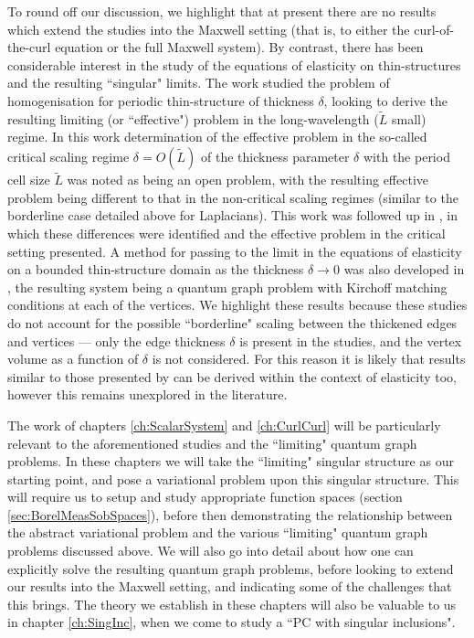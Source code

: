 To round off our discussion, we highlight that at present there are no results which extend the studies \cite{kuchment2001convergence, kuchment2003asymptotics, exner2005convergence} into the Maxwell setting (that is, to either the curl-of-the-curl equation or the full Maxwell system).
By contrast, there has been considerable interest in the study of the equations of elasticity on thin-structures and the resulting ``singular" limits.
The work \cite{zhikov2002homogenization} studied the problem of homogenisation for periodic thin-structure of thickness $\delta$, looking to derive the resulting limiting (or ``effective") problem in the long-wavelength ($\tilde{L}$ small) regime.
In this work determination of the effective problem in the so-called critical scaling regime $\delta=O(\tilde{L})$ of the thickness parameter $\delta$ with the period cell size $\tilde{L}$ was noted as being an open problem, with the resulting effective problem being different to that in the non-critical scaling regimes (similar to the borderline case detailed above for Laplacians).
This work was followed up in \cite{zhikov2003homogenization}, in which these differences were identified and the effective problem in the critical setting presented.
A method for passing to the limit in the equations of elasticity on a bounded thin-structure domain as the thickness $\delta\rightarrow0$ was also developed in \cite{zhikov2006derivation}, the resulting system being a quantum graph problem with Kirchoff matching conditions at each of the vertices.
We highlight these results because these studies do not account for the possible ``borderline" scaling between the thickened edges and vertices --- only the edge thickness $\delta$ is present in the studies, and the vertex volume as a function of $\delta$ is not considered.
For this reason it is likely that results similar to those presented by \cite{exner2005convergence} can be derived within the context of elasticity too, however this remains unexplored in the literature.

The work of chapters \ref{ch:ScalarSystem} and \ref{ch:CurlCurl} will be particularly relevant to the aforementioned studies and the ``limiting" quantum graph problems.
In these chapters we will take the ``limiting" singular structure as our starting point, and pose a variational problem upon this singular structure.
This will require us to setup and study appropriate function spaces (section \ref{sec:BorelMeasSobSpaces}), before then demonstrating the relationship between the abstract variational problem and the various ``limiting" quantum graph problems discussed above.
We will also go into detail about how one can explicitly solve the resulting quantum graph problems, before looking to extend our results into the Maxwell setting, and indicating some of the challenges that this brings.
The theory we establish in these chapters will also be valuable to us in chapter \ref{ch:SingInc}, when we come to study a ``PC with singular inclusions".